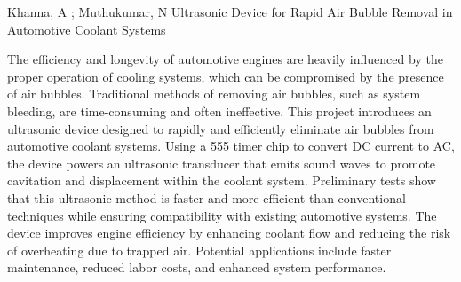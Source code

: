 ﻿Khanna, A ; Muthukumar, N
Ultrasonic Device for Rapid Air Bubble Removal in Automotive Coolant Systems


The efficiency and longevity of automotive engines are heavily influenced by the proper operation of cooling systems, which can be compromised by the presence of air bubbles. Traditional methods of removing air bubbles, such as system bleeding, are time-consuming and often ineffective. This project introduces an ultrasonic device designed to rapidly and efficiently eliminate air bubbles from automotive coolant systems. Using a 555 timer chip to convert DC current to AC, the device powers an ultrasonic transducer that emits sound waves to promote cavitation and displacement within the coolant system. Preliminary tests show that this ultrasonic method is faster and more efficient than conventional techniques while ensuring compatibility with existing automotive systems. The device improves engine efficiency by enhancing coolant flow and reducing the risk of overheating due to trapped air. Potential applications include faster maintenance, reduced labor costs, and enhanced system performance.